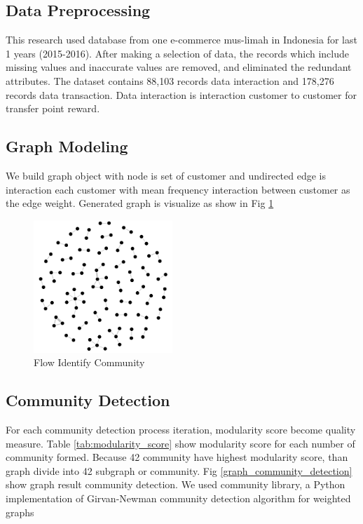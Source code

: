 \documentclass[conference]{IEEEtran}
\begin{document}
\subsection{Data Preprocessing}
This research used database from one e-commerce mus-limah in Indonesia for last 1 years (2015-2016). After making a selection of data, the records which include missing values and inaccurate values are removed, and eliminated the redundant attributes. The dataset contains 88,103 records data interaction and 178,276 records data transaction. Data interaction is interaction customer to customer for transfer point reward.


\subsection{Graph Modeling}
We build graph object with node is set of customer and undirected edge is interaction each customer with mean frequency interaction between customer as the edge weight. Generated graph is visualize as show in Fig \ref{Graph_customer_interaction}

\begin{figure}[h]
\centering
\includegraphics[width=\columnwidth, height=5cm,keepaspectratio]{figure/graph_awal}
\caption{Flow Identify Community}
\label{Graph_customer_interaction}
\end{figure}

\subsection{Community Detection}
For each community detection process iteration, modularity score become quality measure. Table \ref{tab:modularity_score} show modularity score for each number of community formed. Because 42 community have highest modularity score, than graph divide into 42 subgraph or community. Fig \ref{graph_community_detection} show graph result community detection. We used community library, a Python implementation of Girvan-Newman community detection algorithm for weighted graphs \cite{Community}
\end{document}

